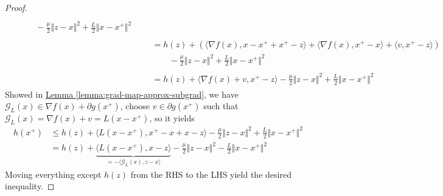 \documentclass[12pt]{article}
\begin{document}
\begin{proof}
\begin{align*}
\begin{aligned}
                \\ 
                &\qquad 
                - \frac{\mu}{2}\Vert z - x\Vert^2
                + \frac{L}{2}\Vert x - x^+\Vert^2
            \end{aligned}
            \\& 
            \begin{aligned}
                &= h(z) + 
                \left(
                    \langle \nabla f(x), x - x^+ + x^+ - z\rangle + 
                    \langle \nabla f(x), x^+ - x\rangle + 
                    \langle v, x^+ - z\rangle
                \right)
                \\
                &\qquad 
                - \frac{\mu}{2}\Vert z - x\Vert^2
                + \frac{L}{2}\Vert x - x^+\Vert^2
            \end{aligned}
            \\& 
            \begin{aligned}
                &= h(z) + 
                \langle \nabla f(x) + v, x^+ - z\rangle 
                - \frac{\mu}{2}\Vert z - x\Vert^2
                + \frac{L}{2}\Vert x - x^+\Vert^2
            \end{aligned}
        \end{align*}
        Showed in  
        \hyperref[lemma:grad-map-approx-subgrad]{Lemma \ref*{lemma:grad-map-approx-subgrad}}, 
        we have $\mathcal G_L(x) \in \nabla f(x) + \partial g(x^+)$, choose $v \in \partial g(x^+)$ such that $\mathcal G_L(x) = \nabla f(x) + v = L(x - x^+)$, so it yields
        \begin{align*}
            h(x^+) & 
            \le  
            h(z) + \langle L(x - x^+), x^+ - x + x - z\rangle 
            - \frac{\mu}{2}\Vert z - x\Vert^2
            + \frac{L}{2}\Vert x - x^+\Vert^2
            \\
            &= h(z) + 
            \underbrace{\langle L(x - x^+), x - z\rangle}_{
                = - \langle \mathcal G_L (x), z - x\rangle
            }
            - \frac{\mu}{2}\Vert z - x\Vert^2
            - \frac{L}{2}\Vert x - x^+\Vert^2
        \end{align*}
        Moving everything except $h(z)$ from the RHS to the LHS yield the desired inequality. 
    \end{proof}
\end{document}
